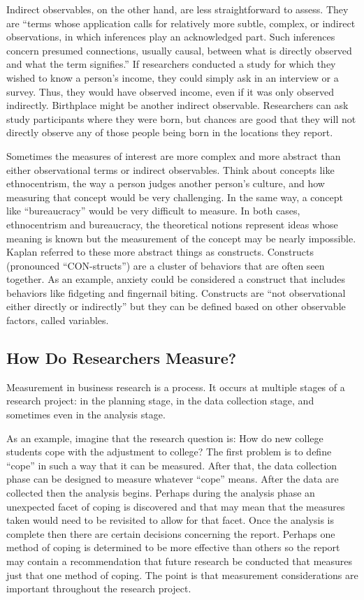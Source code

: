 Indirect observables, on the other hand, are less straightforward to assess. They are ``terms whose application calls for relatively more subtle, complex, or indirect observations, in which inferences play an acknowledged part. Such inferences concern presumed connections, usually causal, between what is directly observed and what the term signifies.'' If researchers conducted a study for which they wished to know a person's income, they could simply ask in an interview or a survey. Thus, they would have observed income, even if it was only observed indirectly. Birthplace might be another indirect observable. Researchers can ask study participants where they were born, but chances are good that they will not directly observe any of those people being born in the locations they report.

Sometimes the measures of interest are more complex and more abstract than either observational terms or indirect observables. Think about concepts like ethnocentrism, the way a person judges another person's culture, and how measuring that concept would be very challenging. In the same way, a concept like  ``bureaucracy'' would be very difficult to measure. In both cases, ethnocentrism and bureaucracy, the theoretical notions represent ideas whose meaning is known but the measurement of the concept may be nearly impossible. Kaplan referred to these more abstract things as \glspl{construct}. Constructs (pronounced ``CON-structs'') are a cluster of behaviors that are often seen together. As an example, anxiety could be considered a construct that includes behaviors like fidgeting and fingernail biting. Constructs are ``not observational either directly or indirectly'' but they can be defined based on other observable factors, called \glspl{variable}.

\subsection{How Do Researchers Measure?}

Measurement in business research is a process. It occurs at multiple stages of a research project: in the planning stage, in the data collection stage, and sometimes even in the analysis stage. 

As an example, imagine that the research question is: How do new college students cope with the adjustment to college? The first problem is to define ``cope'' in such a way that it can be measured. After that, the data collection phase can be designed to measure whatever ``cope'' means. After the data are collected then the analysis begins. Perhaps during the analysis phase an unexpected facet of coping is discovered and that may mean that the measures taken would need to be revisited to allow for that facet. Once the analysis is complete then there are certain decisions concerning the report. Perhaps one method of coping is determined to be more effective than others so the report may contain a recommendation that future research be conducted that measures just that one method of coping. The point is that measurement considerations are important throughout the research project.

